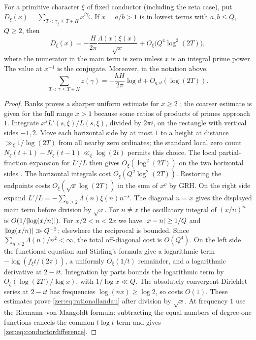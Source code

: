 \begin{lemma}\label{zer:lem:rational}
For a primitive character $\xi$ of fixed conductor (including the zeta case), put
$D_\xi(x)=\sum_{T<\gamma_\xi\le T+H}x^{i\gamma_\xi}$. If $x=a/b>1$ is in lowest terms with
$a,b\le Q$, $Q\ge2$, then
\begin{equation}\label{zer:eq:rationallandau}
 D_\xi(x)=-\frac H{2\pi}\frac{\Lambda(x)\xi(x)}{\sqrt x}+O_\xi\bigl(Q^4\log^2(2T)\bigr),
\end{equation}
where the numerator in the main term is zero unless $x$ is an integral prime power. The
value at $x^{-1}$ is the conjugate. Moreover, in the notation above,
\begin{equation}\label{zer:eq:conductordifference}
 \sum_{T<\gamma\le T+H}z(\gamma)=-\frac{hH}{2\pi}\log d+O_{q,d}(\log(2T)).
\end{equation}
\end{lemma}
\begin{proof}
Banks proves a sharper uniform estimate for $x\ge2$ \cite[Theorem~1.2]{Banks2023Comparing};
the coarser estimate is given for the full range $x>1$ because some ratios of products of
primes approach $1$. Integrate $x^sL'(s,\xi)/L(s,\xi)$, divided by $2\pi i$, on the
rectangle with vertical sides $-1,2$. Move each horizontal side by at most $1$ to a height
at distance $\gg_\xi1/\log(2T)$ from all nearby zero ordinates; the standard local zero
count $N_\xi(t+1)-N_\xi(t-1)\ll_\xi\log(2t)$ permits this choice. The local
partial-fraction expansion for $L'/L$ then gives $O_\xi(\log^2(2T))$ on the two horizontal
sides \cite[Lemma~2.2]{Banks2023Comparing}. The horizontal integrals cost
$O_\xi(Q^2\log^2(2T))$. Restoring the endpoints costs $O_\xi(\sqrt x\log(2T))$ in the sum
of $x^\rho$ by GRH. On the right side expand $L'/L=-\sum_{n\ge2}\Lambda(n)\xi(n)n^{-s}$.
The diagonal $n=x$ gives the displayed main term before division by $\sqrt x$. For $n\ne x$
the oscillatory integral of $(x/n)^{it}$ is $O(1/\lvert\log(x/n)\rvert)$. For $x/2<n<2x$ we have
$\lvert x-n\rvert\ge1/Q$ and $\lvert\log(x/n)\rvert\gg Q^{-2}$; elsewhere the reciprocal is bounded.
Since $\sum_{n\ge2}\Lambda(n)/n^2<\infty$, the total off-diagonal cost is $O(Q^4)$. On the
left side the functional equation and Stirling's formula give a logarithmic term
$-\log(f_\xi t/(2\pi))$, a uniformly $O_\xi(1/t)$ remainder, and a logarithmic derivative
at $2-it$. Integration by parts bounds the logarithmic term by $O_\xi(\log(2T)/\log x)$,
with $1/\log x\ll Q$. The absolutely convergent Dirichlet series at $2-it$ has frequencies
$\log(nx)\ge\log2$, so costs $O(1)$. These estimates prove \eqref{zer:eq:rationallandau}
after division by $\sqrt x$. At frequency $1$ use the Riemann--von Mangoldt formula:
subtracting the equal numbers of degree-one functions cancels the common $t\log t$ term and
gives \eqref{zer:eq:conductordifference}.
\end{proof}

